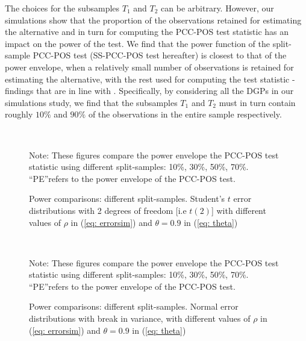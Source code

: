\documentclass[harvard,11pt]{article}
\begin{document}
The choices for the subsamples $T_1$ and $T_2$ can be arbitrary. However, our simulations show that the proportion of the observations retained for estimating the alternative and in turn for computing the PCC-POS test statistic has an impact on the power of the test. We find that the power function of the split-sample PCC-POS test (SS-PCC-POS test hereafter) is closest to that of the power envelope, when a relatively small number of observations is retained for estimating the alternative, with the rest used for computing the test statistic - findings that are in line with \citet{dufour2010exact}. Specifically, by considering all the DGPs in our simulations study, we find that the subsamples $T_1$ and $T_2$ must in turn contain roughly $10\%$ and $90\%$ of the observations in the entire sample respectively.  
\begin{figure}[tbph]
\caption{Power comparisons: different split-samples. Student's $t$ error distributions with 2 degrees of freedom [i.e $t(2)$] with
different values of $\rho $ in (\ref{eq: errorsim}) and $\theta =0.9$ in (\ref{eq: theta})}
\begin{center}
 \\[0pt]
\end{center}
\doublespacing
Note: These figures compare the power
envelope the PCC-POS test statistic using different split-samples: 10\%, 30\%, 50\%, 70\%. \textquotedblleft PE\textquotedblright refers to the power envelope of the PCC-POS test.
\label{fig: Power comparison using different tests Normal}
\end{figure}


\begin{figure}[tbph]
\caption{Power comparisons: different split-samples. Normal error distributions with break in variance, with
different values of $\rho $ in (\ref{eq: errorsim}) and $\theta =0.9$ in (\ref{eq: theta})}
\begin{center}
 \\[0pt]
\end{center}
\doublespacing
Note: These figures compare the power
envelope the PCC-POS test statistic using different split-samples: 10\%, 30\%, 50\%, 70\%. \textquotedblleft PE\textquotedblright refers to the power envelope of the PCC-POS test.
\label{fig: SS410}
\end{figure}
\end{document}
